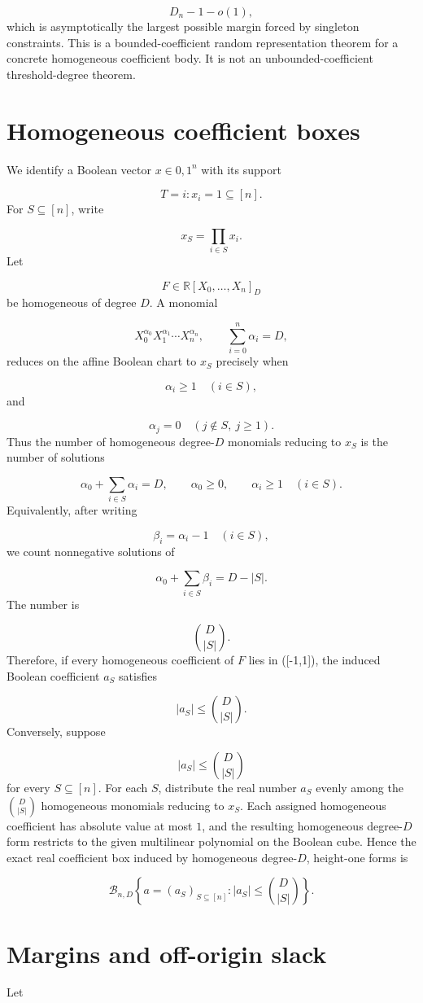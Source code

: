 \documentclass[11pt]{article}
\theoremstyle{definition}
\begin{document}
\[
D_n-1-o(1),
\]
which is asymptotically the largest possible margin forced by singleton constraints. This is a bounded-coefficient random representation theorem for a concrete homogeneous coefficient body. It is not an unbounded-coefficient threshold-degree theorem.

\section{Homogeneous coefficient boxes}
We identify a Boolean vector $x\in{0,1}^n$ with its support

\[
T={i:x_i=1}\subseteq[n].
\]
For $S\subseteq[n]$, write

\[
x_S=\prod_{i\in S}x_i.
\]
Let

\[
F\in\mathbb{R}[X_0,\dots,X_n]_D
\]
be homogeneous of degree $D$. A monomial

\[
X_0^{\alpha_0}X_1^{\alpha_1}\cdots X_n^{\alpha_n},
\qquad
\sum_{i=0}^n\alpha_i=D,
\]
reduces on the affine Boolean chart to $x_S$ precisely when

\[
\alpha_i\ge1 \quad (i\in S),
\]
and

\[
\alpha_j=0 \quad (j\notin S,\ j\ge1).
\]
Thus the number of homogeneous degree-$D$ monomials reducing to $x_S$ is the number of solutions

\[
\alpha_0+\sum_{i\in S}\alpha_i=D,
\qquad
\alpha_0\ge0,
\qquad
\alpha_i\ge1\quad(i\in S).
\]
Equivalently, after writing

\[
\beta_i=\alpha_i-1\quad(i\in S),
\]
we count nonnegative solutions of

\[
\alpha_0+\sum_{i\in S}\beta_i=D-|S|.
\]
The number is

\[
\binom{D}{|S|}.
\]
Therefore, if every homogeneous coefficient of $F$ lies in ([-1,1]), the induced Boolean coefficient $a_S$ satisfies

\[
|a_S|\le \binom{D}{|S|}.
\]
Conversely, suppose

\[
|a_S|\le \binom{D}{|S|}
\]
for every $S\subseteq[n]$. For each $S$, distribute the real number $a_S$ evenly among the $\binom{D}{|S|}$ homogeneous monomials reducing to $x_S$. Each assigned homogeneous coefficient has absolute value at most $1$, and the resulting homogeneous degree-$D$ form restricts to the given multilinear polynomial on the Boolean cube. Hence the exact real coefficient box induced by homogeneous degree-$D$, height-one forms is

\[
\mathcal B_{n,D}
\left\{
a=(a_S)_{S\subseteq[n]}:
|a_S|\le \binom{D}{|S|}
\right\}.
\]
\section{Margins and off-origin slack}
Let
\end{document}
